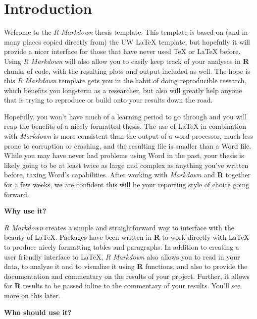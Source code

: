 \documentclass[twoside,12pt,final]{ucthesis-CA2012}
\begin{document}
\begin{ucmainmatter}

\hypertarget{introduction}{%
\chapter*{Introduction}\label{introduction}}

Welcome to the \emph{R Markdown} thesis template. This template is based
on (and in many places copied directly from) the UW LaTeX template, but
hopefully it will provide a nicer interface for those that have never
used TeX or LaTeX before. Using \emph{R Markdown} will also allow you to
easily keep track of your analyses in \textbf{R} chunks of code, with
the resulting plots and output included as well. The hope is this
\emph{R Markdown} template gets you in the habit of doing reproducible
research, which benefits you long-term as a researcher, but also will
greatly help anyone that is trying to reproduce or build onto your
results down the road.

Hopefully, you won't have much of a learning period to go through and
you will reap the benefits of a nicely formatted thesis. The use of
LaTeX in combination with \emph{Markdown} is more consistent than the
output of a word processor, much less prone to corruption or crashing,
and the resulting file is smaller than a Word file. While you may have
never had problems using Word in the past, your thesis is likely going
to be at least twice as large and complex as anything you've written
before, taxing Word's capabilities. After working with \emph{Markdown}
and \textbf{R} together for a few weeks, we are confident this will be
your reporting style of choice going forward.

\textbf{Why use it?}

\emph{R Markdown} creates a simple and straightforward way to interface
with the beauty of LaTeX. Packages have been written in \textbf{R} to
work directly with LaTeX to produce nicely formatting tables and
paragraphs. In addition to creating a user friendly interface to LaTeX,
\emph{R Markdown} also allows you to read in your data, to analyze it
and to visualize it using \textbf{R} functions, and also to provide the
documentation and commentary on the results of your project. Further, it
allows for \textbf{R} results to be passed inline to the commentary of
your results. You'll see more on this later.

\textbf{Who should use it?}


\end{ucmainmatter}
\end{document}
